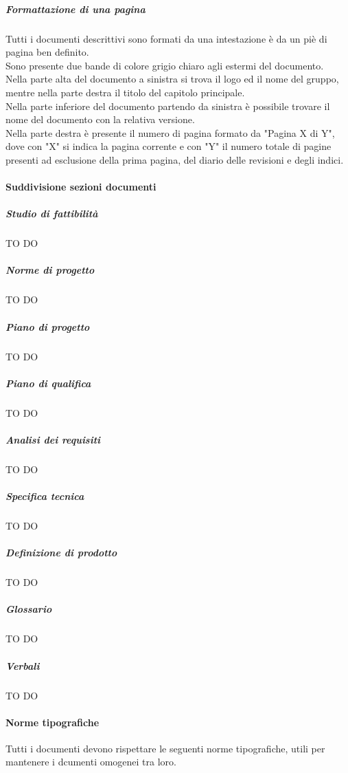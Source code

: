 				\subparagraph{Formattazione di una pagina}
				Tutti i documenti descrittivi sono formati da una intestazione è da un piè di pagina ben definito.\\
				Sono presente due bande di colore grigio chiaro agli estermi del documento.\\
				Nella parte alta del documento a sinistra si trova il logo ed il nome del gruppo, mentre nella parte destra il titolo del capitolo principale.\\
				Nella parte inferiore del documento partendo da sinistra è possibile trovare il nome del documento con la relativa versione.\\
				Nella parte destra è presente il numero di pagina formato da "Pagina X di Y", dove con "X" si indica la pagina corrente e con "Y" il numero totale di pagine presenti ad esclusione della prima pagina, del diario delle revisioni e degli indici.

			\paragraph{Suddivisione sezioni documenti}
				
				\subparagraph{Studio di fattibilità}
					TO DO
				
				\subparagraph{Norme di progetto}
					TO DO
				
				\subparagraph{Piano di progetto}
					TO DO
				
				\subparagraph{Piano di qualifica}
					TO DO
				
				\subparagraph{Analisi dei requisiti}
					TO DO
				
				\subparagraph{Specifica tecnica}
					TO DO
				
				\subparagraph{Definizione di prodotto}
					TO DO
				
				\subparagraph{Glossario}
					TO DO
				
				\subparagraph{Verbali}
					TO DO


			\paragraph{Norme tipografiche}
			Tutti i documenti devono rispettare le seguenti norme tipografiche, utili per mantenere i dcumenti omogenei tra loro.
				
